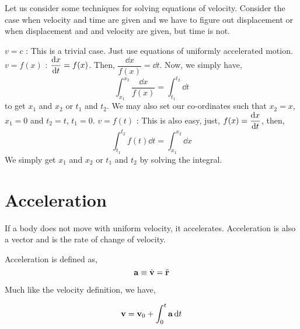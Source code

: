 
\begin{algorithm}
    Let us consider some techniques for solving equations of velocity. Consider the case when velocity and time are given
    and we have to figure out displacement or when displacement and and velocity are given, but time is not. 
    \begin{enumerate}
        \ii \(v = c\) : This is a trivial case. Just use equations of uniformly accelerated motion.
        \ii \(v = f(x)\) : \(\displaystyle \dv{x}{t} = f(x)\). Then, \(\dfrac{\dd{x}}{f(x)} = \dd{t}\).
        Now, we simply have, \[
            \int^{x_2}_{x_1} \frac{\dd{x}}{f(x)} = \int^{t_2}_{t_1} \dd{t}
        \] to get \(x_1\) and \(x_2\) or \(t_1\) and \(t_2\). We may also set our co-ordinates such that \(x_2 = x\), \(x_1 = 0\) and \(t_2 = t\), \(t_1 = 0\).
        \ii \(v = f(t)\) : This is also easy, just, \(\displaystyle f(x) = \dv{x}{t}\), then,
        \[
            \int^{t_2}_{t_1} f(t) \dd{t} = \int^{x_2}_{x_1} \dd{x}
        \] We simply get \(x_1\) and \(x_2\) or \(t_1\) and \(t_2\) by solving the integral.
    \end{enumerate}
\end{algorithm}

\section{Acceleration}

If a body does not move with uniform velocity, it accelerates. Acceleration is also a vector and
is the rate of change of velocity.


\begin{definition}
    [Acceleration]
    \label{def: acceleration}
    Acceleration is defined as,
    \begin{equation}
        \boldsymbol{\mathbf{a}} \equiv \dot{\boldsymbol{\mathbf{v}}} = \ddot{\boldsymbol{\mathbf{r}}}    
    \end{equation}
\end{definition}

Much like the velocity definition, we have,

\begin{equation}
    \boldsymbol{\mathbf{v}} = \boldsymbol{\mathbf{v}}_0 + \int_0^t \boldsymbol{\mathbf{a}} \dd{t}
\end{equation}

